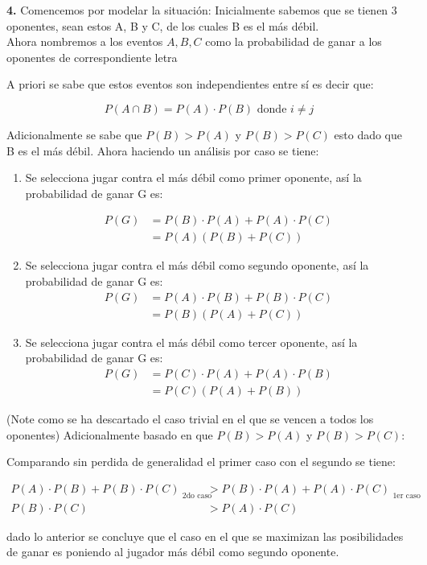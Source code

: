 \documentclass[a4paper,12pt]{article}
\begin{document}
	\newpage		%

	\textbf{4.}	Comencemos por modelar la situación: Inicialmente sabemos que se tienen 3 oponentes, sean estos
	A, B y C, de los cuales B es el más débil.\\

	Ahora nombremos a los eventos $A, B, C$ como la probabilidad de ganar a los oponentes de correspondiente letra 

	A priori se sabe que estos eventos son independientes entre sí es decir que:

	\begin{equation*}
		P(A\cap B) = P(A) \cdot P(B) \text{ donde } i \neq j
	\end{equation*}

	Adicionalmente se sabe que $P(B) > P(A)$ y  $P(B) > P(C)$ esto dado que B es el más débil.
	Ahora haciendo un análisis por caso se tiene:


	\begin{enumerate}
		\item Se selecciona jugar contra el más débil como primer oponente, así la probabilidad de ganar G es:

			\begin{align*}
				P(G) &= P(B)\cdot P(A) + P(A)\cdot P(C)\\
				&= P(A)(P(B) + P(C))
			\end{align*}

		\item Se selecciona jugar contra el más débil como segundo oponente, así la probabilidad de ganar G es:
			\begin{align*}
				P(G) &= P(A)\cdot P(B) + P(B)\cdot P(C)\\
				&= P(B)(P(A) + P(C))
			\end{align*}

		\item Se selecciona jugar contra el más débil como tercer oponente, así la probabilidad de ganar G es:
			\begin{align*}
				P(G) &= P(C)\cdot P(A) + P(A)\cdot P(B)\\
				&= P(C)(P(A) + P(B))
			\end{align*}
	\end{enumerate}

	(Note como se ha descartado el caso trivial en el que se vencen a todos los oponentes)
	Adicionalmente basado en que $P(B) > P(A)$ y  $P(B) > P(C)$:

	Comparando sin perdida de generalidad el primer caso con el segundo se tiene:

	\begin{align*}
			P(A)\cdot P(B) + P(B)\cdot P(C)_{\text{    2do caso}}	&> P(B)\cdot P(A) + P(A)\cdot P(C)_{\text{  1er caso}}\\
			P(B)\cdot P(C) &> P(A)\cdot P(C)
	\end{align*}

	dado lo anterior se concluye que el caso en el que se maximizan las posibilidades de ganar es poniendo 
	al jugador más débil como segundo oponente.
\end{document}
